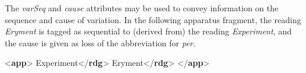 The {\itshape varSeq} and {\itshape cause} attributes may be used to convey information on the sequence and cause of variation. In the following apparatus fragment, the reading \textit{Eryment} is tagged as sequential to (derived from) the reading \textit{Experiment}, and the cause is given as loss of the abbreviation for \textit{per}. \par\bgroup{}\exampleFont \begin{shaded}\noindent\mbox{}{<\textbf{app}>}\mbox{}\newline 
{}Experiment{</\textbf{rdg}>}\mbox{}\newline 
{}Eryment{</\textbf{rdg}>}\mbox{}\newline 
{</\textbf{app}>}\end{shaded}\egroup\par \par
